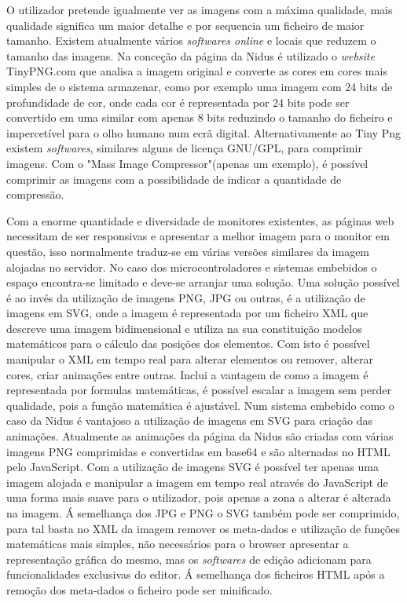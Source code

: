 O utilizador pretende igualmente ver as imagens com a máxima qualidade, mais qualidade significa um maior detalhe e por sequencia um ficheiro de maior tamanho. Existem atualmente vários \textit{softwares online} e locais que reduzem o tamanho das imagens. Na conceção da página da Nidus é utilizado o \textit{website} TinyPNG.com que analisa a imagem original e converte as cores em cores mais simples de o sistema armazenar, como por exemplo uma imagem com 24 bits de profundidade de cor, onde cada cor é representada por 24 bits pode ser convertido em uma similar com apenas 8 bits reduzindo o tamanho do ficheiro e impercetível para o olho humano num ecrã digital\cite{Hilles2019}. Alternativamente ao Tiny Png existem \textit{softwares}, similares alguns de licença GNU/GPL, para comprimir imagens. Com o "Mass Image Compressor"\cite{Mass_Image_Compressor}(apenas um exemplo), é possível comprimir as imagens com a possibilidade de indicar a quantidade de compressão.
\par
Com a enorme quantidade e diversidade de monitores existentes, as páginas web necessitam de ser responsivas e apresentar a melhor imagem para o monitor em questão, isso normalmente traduz-se em várias versões similares da imagem alojadas no servidor. No caso dos microcontroladores e sistemas embebidos o espaço encontra-se limitado e deve-se arranjar uma solução. Uma solução possível é ao invés da utilização de imagens PNG, JPG ou outras, é a utilização de imagens em SVG, onde a imagem é representada por um ficheiro XML que descreve uma imagem bidimensional e utiliza na sua constituição modelos matemáticos para o cálculo das posições dos elementos. Com isto é possível manipular o XML em tempo real para alterar elementos ou remover, alterar cores, criar animações entre outras. Inclui a vantagem de como a imagem é representada por formulas matemáticas, é possível escalar a imagem sem perder qualidade, pois a função matemática é ajustável. Num sistema embebido como o caso da Nidus é vantajoso a utilização de imagens em SVG para criação das animações. Atualmente as animações da página da Nidus são criadas com várias imagens PNG comprimidas e convertidas em base64 e são alternadas no HTML pelo JavaScript. Com a utilização de imagens SVG é possível ter apenas uma imagem alojada e manipular a imagem em tempo real através do JavaScript de uma forma mais suave para o utilizador, pois apenas a zona a alterar é alterada na imagem.
Á semelhança dos JPG e PNG o SVG também pode ser comprimido, para tal basta no XML da imagem remover os meta-dados e utilização de funções matemáticas mais simples, não necessários para o browser apresentar a representação gráfica do mesmo, mas os \textit{softwares} de edição adicionam para funcionalidades exclusivas do editor. Á semelhança dos ficheiros HTML após a remoção dos meta-dados o ficheiro pode ser minificado.

